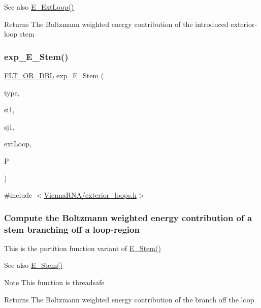 \begin{DoxySeeAlso}{See also}
\mbox{\hyperlink{group__loops_ga05c6288c5a79d3bd5ad6d33c1bb34bd0}{E\+\_\+\+Ext\+Loop()}} 
\end{DoxySeeAlso}
\begin{DoxyReturn}{Returns}
The Boltzmann weighted energy contribution of the introduced exterior-\/loop stem 
\end{DoxyReturn}
\mbox{\label{group__loops_gab0aa9833ab41875a91a9be8a5ffd7092}} 
\subsubsection{\texorpdfstring{exp\+\_\+\+E\+\_\+\+Stem()}{exp\_E\_Stem()}}
{\footnotesize\ttfamily \mbox{\hyperlink{group__data__structures_ga31125aeace516926bf7f251f759b6126}{F\+L\+T\+\_\+\+O\+R\+\_\+\+D\+BL}} exp\+\_\+\+E\+\_\+\+Stem (\begin{DoxyParamCaption}\item[{int}]{type,  }\item[{int}]{si1,  }\item[{int}]{sj1,  }\item[{int}]{ext\+Loop,  }\item[{\mbox{\hyperlink{group__energy__parameters_ga01d8b92fe734df8d79a6169482c7d8d8}{vrna\+\_\+exp\+\_\+param\+\_\+t}} $\ast$}]{P }\end{DoxyParamCaption})}



{\ttfamily \#include $<$\mbox{\hyperlink{exterior__loops_8h}{Vienna\+R\+N\+A/exterior\+\_\+loops.\+h}}$>$}

\subsubsection*{Compute the Boltzmann weighted energy contribution of a stem branching off a loop-\/region}

This is the partition function variant of \mbox{\hyperlink{group__loops_ga51f9851f3500c2aae66674142a6a2dd5}{E\+\_\+\+Stem()}} \begin{DoxySeeAlso}{See also}
\mbox{\hyperlink{group__loops_ga51f9851f3500c2aae66674142a6a2dd5}{E\+\_\+\+Stem()}} 
\end{DoxySeeAlso}
\begin{DoxyNote}{Note}
This function is threadsafe
\end{DoxyNote}
\begin{DoxyReturn}{Returns}
The Boltzmann weighted energy contribution of the branch off the loop 
\end{DoxyReturn}
\mbox{\label{group__loops_gadf943ee9a45b7f4cee9192c06210dace}} 
